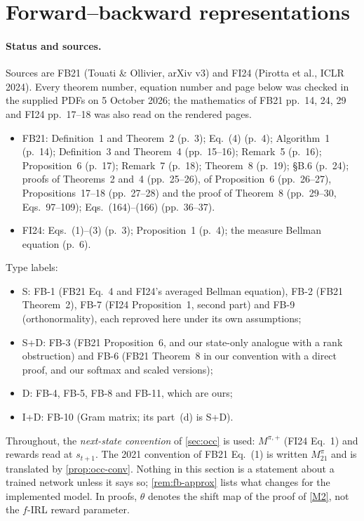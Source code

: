 \section{Forward--backward representations}\label{sec:fb}

\paragraph{Status and sources.}
Sources are FB21 (Touati \& Ollivier, arXiv v3) and FI24 (Pirotta et al., ICLR 2024).
Every theorem number, equation number and page below was checked in the supplied PDFs on 5 October 2026; the mathematics of FB21 pp.~14, 24, 29 and FI24 pp.~17--18 was also read on the rendered pages.
\begin{itemize}[nosep]
\item FB21: Definition~1 and Theorem~2 (p.~3); Eq.~(4) (p.~4); Algorithm~1 (p.~14); Definition~3 and Theorem~4 (pp.~15--16); Remark~5 (p.~16); Proposition~6 (p.~17); Remark~7 (p.~18); Theorem~8 (p.~19); \S B.6 (p.~24); proofs of Theorems~2 and~4 (pp.~25--26), of Proposition~6 (pp.~26--27), Propositions~17--18 (pp.~27--28) and the proof of Theorem~8 (pp.~29--30, Eqs.~97--109); Eqs.~(164)--(166) (pp.~36--37).
\item FI24: Eqs.~(1)--(3) (p.~3); Proposition~1 (p.~4); the measure Bellman equation (p.~6).
\end{itemize}
Type labels:
\begin{itemize}[nosep]
\item \textsf{S}: FB-1 (FB21 Eq.~4 and FI24's averaged Bellman equation), FB-2 (FB21 Theorem~2), FB-7 (FI24 Proposition~1, second part) and FB-9 (orthonormality), each reproved here under its own assumptions;
\item \textsf{S+D}: FB-3 (FB21 Proposition~6, and our state-only analogue with a rank obstruction) and FB-6 (FB21 Theorem~8 in our convention with a direct proof, and our softmax and scaled versions);
\item \textsf{D}: FB-4, FB-5, FB-8 and FB-11, which are ours;
\item \textsf{I+D}: FB-10 (Gram matrix; its part~(d) is \textsf{S+D}).
\end{itemize}
Throughout, the \emph{next-state convention} of \cref{sec:occ} is used: $M^{\pi,+}$ (FI24 Eq.~1) and rewards read at $s_{t+1}$.
The 2021 convention of FB21 Eq.~(1) is written $M^\pi_{21}$ and is translated by \cref{prop:occ-conv}.
Nothing in this section is a statement about a trained network unless it says so; \cref{rem:fb-approx} lists what changes for the implemented model.
In proofs, $\theta$ denotes the shift map of the proof of \ref{M2}, not the $f$-IRL reward parameter.

